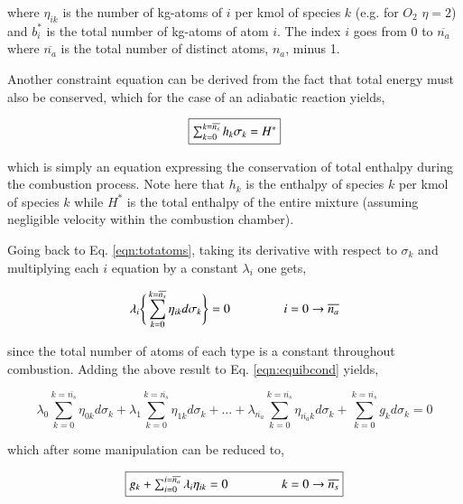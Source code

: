 	where $\eta_{ik}$ is the number of kg-atoms of $i$ per kmol of species $k$ (e.g. for $O_2$
$\eta = 2$) and $b_i^*$ is the total number of kg-atoms of atom $i$.  The index $i$ goes from 
0 to $\overline{n_a}$ where $\overline{n_a}$ is the total number of distinct atoms, $n_a$, minus 1.  

	Another constraint equation can be derived from the fact that total energy must also be conserved, 
which for the case of an adiabatic reaction yields,

\begin{equation}
	\fbox{$
	\sum_{k=0}^{k=\overline{n_s}}h_k\sigma_k = H^*	
	$}
\label{eqn:totenth}
\end{equation}

	which is simply an equation expressing the conservation of total enthalpy during
the combustion process.  Note here that $h_k$ is the enthalpy of species $k$ per kmol 
of species $k$ while $H^*$ is the total enthalpy of the entire mixture (assuming negligible
velocity within the combustion chamber).

	Going back to Eq. \ref{eqn:totatoms}, taking its derivative with respect to $\sigma_k$ 
and multiplying each $i$ equation by a constant $\lambda_i$ one gets,

\begin{displaymath}
	\lambda_i\Bigg\{\sum_{k=0}^{k=\overline{n_s}}\eta_{ik}d\sigma_k\Bigg\} = 0 \hspace {15mm} i=0\rightarrow 
	\overline{n_a}
\end{displaymath}

	since the total number of atoms of each type is a constant throughout combustion.  
Adding the above result to Eq. \ref{eqn:equibcond} yields,

\begin{displaymath}
	\lambda_0\sum_{k=0}^{k=\overline{n_s}}\eta_{0k}d\sigma_k + \lambda_1\sum_{k=0}^{k=\overline{n_s}}\eta_{1k}
	d\sigma_k + \ldots + \lambda_{\overline{n_a}}\sum_{k=0}^{k=\overline{n_s}}\eta_{\overline{n_a} k}
	d\sigma_k + \sum_{k=0}^{k=\overline{n_s}}g_k d\sigma_k = 0
\end{displaymath}

	which after some manipulation can be reduced to,

\begin{equation}
	\fbox{$
	g_k + \sum_{i=0}^{i=\overline{n_a}}\lambda_i\eta_{ik} = 0 \hspace{15mm}k=0\rightarrow \overline{n_s}
	$}
\label{eqn:lambdaone}
\end{equation}

